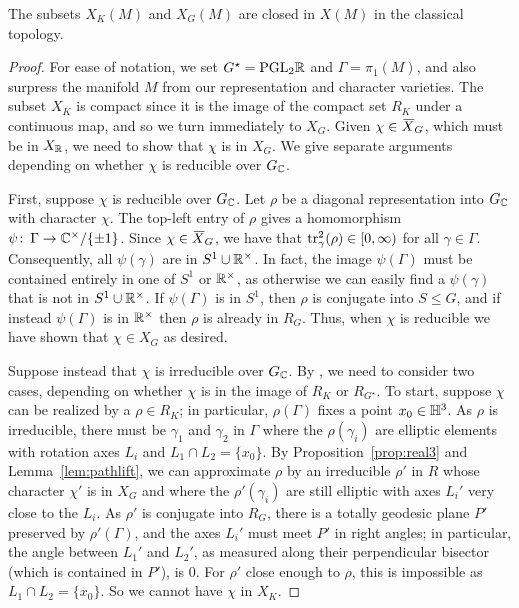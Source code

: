 \documentclass[tikz, sepfignums, defaultenums]{nmd/article}
\newcommand{\GG}{{G^\star}}
\newcommand{\XG}[1]{\mathit{X}_{G}\left(#1\right)}
\newcommand{\GC}{G_\C}
\newcommand{\Cunits}{\C^\times}
\newcommand{\Runits}{\R^\times}
\begin{document}
\begin{lemma}\label{lem:closed}
  The subsets $X_K(M)$ and $\XG{M}$ are closed in $X(M)$ in the
  classical topology.  
\end{lemma}

\begin{proof}
For ease of notation, we set $\GG = \PGL{2}{\R}$ and
$\Gamma = \pi_1(M)$, and also surpress the manifold $M$ from our
representation and character varieties.  The subset $X_K$ is compact
since it is the image of the compact set $R_K$ under a continuous map,
and so we turn immediately to $X_G$.  Given $\chi \in \Xbar_G$, which
must be in $X_{\mathbb R}$, we need to show that $\chi$ is in $X_G$.  We give
separate arguments depending on whether $\chi$ is reducible over
$\GC$.

First, suppose $\chi$ is reducible over $\GC$.  Let $\rho$ be a
diagonal representation into $\GC$ with character $\chi$.  The
top-left entry of $\rho$ gives a homomorphism
$\psi \maps \Gamma \to \Cunits/\{\pm 1\}$.  Since $\chi \in \Xbar_G$,
we have that $\operatorname{tr}^2_\gamma(\rho) \in [0, \infty)$ for all
$\gamma \in \Gamma$.  Consequently, all $\psi(\gamma)$ are in
$S^1 \cup \Runits$.  In fact, the image $\psi(\Gamma)$ must be
contained entirely in one of $S^1$ or $\Runits$, as otherwise we can
easily find a $\psi(\gamma)$ that is not in $S^1 \cup \Runits$.  If
$\psi(\Gamma)$ is in $S^1$, then $\rho$ is conjugate into $S \leq G$,
and if instead $\psi(\Gamma)$ is in $\Runits$ then $\rho$ is already
in $R_G$.  Thus, when $\chi$ is reducible we have shown that
$\chi \in X_G$ as desired.

Suppose instead that $\chi$ is irreducible over $\GC$.  By \cite[Lemma
10.1]{HeusenerPorti2004}, we need to consider two cases, depending on
whether $\chi$ is in the image of $R_K$ or $R_\GG$.  To start, suppose
$\chi$ can be realized by a $\rho \in R_K$; in particular,
$\rho(\Gamma)$ fixes a point $x_0 \in {\mathbb{H}}^3$.  As $\rho$ is
irreducible, there must be $\gamma_1$ and $\gamma_2$ in $\Gamma$ where
the $\rho(\gamma_i)$ are elliptic elements with rotation axes $L_i$
and $L_1 \cap L_2 = \{x_0\}$.  By Proposition~\ref{prop:real3} and
Lemma~\ref{lem:pathlift}, we can approximate $\rho$ by an
irreducible $\rho'$ in $R$ whose character $\chi'$ is in $X_G$ and
where the $\rho'(\gamma_i)$ are still elliptic with axes $L_i'$ very close
to the $L_i$.  As $\rho'$ is conjugate into $R_G$, there is a totally
geodesic plane $P'$ preserved by $\rho'(\Gamma)$, and the axes $L_i'$
must meet $P'$ in right angles; in particular, the angle between $L_1'$
and $L_2'$, as measured along their perpendicular bisector (which is
contained in $P'$), is $0$.  For $\rho'$ close enough to $\rho$, this
is impossible as $L_1 \cap L_2 = \{x_0\}$.  So we cannot have $\chi$
in $X_K$.


\end{proof}
\end{document}

